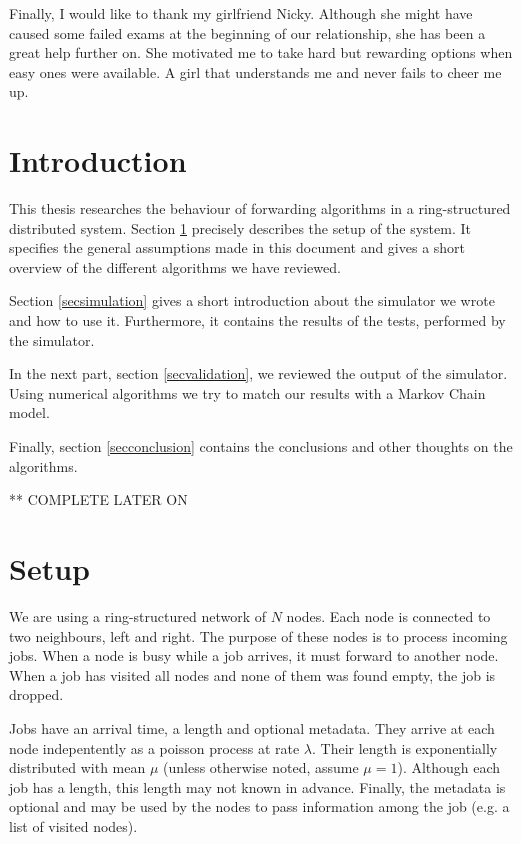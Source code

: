 \documentclass[10pt,a4paper]{article}
\begin{document}
Finally, I would like to thank my girlfriend Nicky. Although she might have caused some failed exams at the beginning of our relationship, she has been a great help further on. She motivated me to take hard but rewarding options when easy ones were available. A girl that understands me and never fails to cheer me up.



\newpage

\tableofcontents

\newpage

\section*{Introduction}
This thesis researches the behaviour of forwarding algorithms in a ring-structured distributed system. Section \ref{secsetup} precisely describes the setup of the system. It specifies the general assumptions made in this document and gives a short overview of the different algorithms we have reviewed.

Section \ref{secsimulation} gives a short introduction about the simulator we wrote and how to use it. Furthermore, it contains the results of the tests, performed by the simulator.

In the next part, section \ref{secvalidation}, we reviewed the output of the simulator. Using numerical algorithms we try to match our results with a Markov Chain model.

Finally, section \ref{secconclusion} contains the conclusions and other thoughts on the algorithms.

** COMPLETE LATER ON

\section{Setup}
\label{secsetup}
We are using a ring-structured network of $N$ nodes. Each node is connected to two neighbours, left and right. The purpose of these nodes is to process incoming jobs. When a node is busy while a job arrives, it must forward to another node. When a job has visited all nodes and none of them was found empty, the job is dropped.

Jobs have an arrival time, a length and optional metadata. They arrive at each node indepentently as a poisson process at rate $\lambda$. Their length is exponentially distributed with mean $\mu$ (unless otherwise noted, assume $\mu=1$). Although each job has a length, this length may not known in advance. Finally, the metadata is optional and may be used by the nodes to pass information among the job (e.g. a list of visited nodes).
\end{document}
